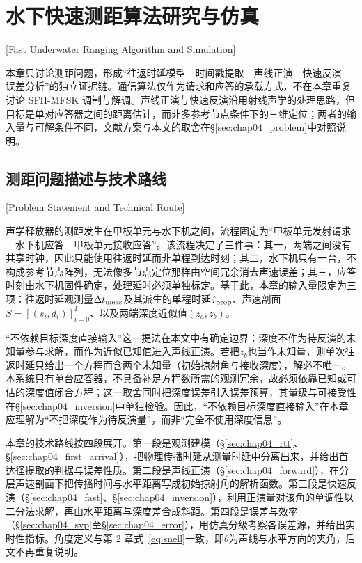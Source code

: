 
\chapter{水下快速测距算法研究与仿真}[Fast Underwater Ranging Algorithm and Simulation]
\label{chap04}

本章只讨论测距问题，形成“往返时延模型—时间戳提取—声线正演—快速反演—误差分析”的独立证据链。通信算法仅作为请求和应答的承载方式，不在本章重复讨论 SFH-MFSK 调制与解调。声线正演与快速反演沿用射线声学的处理思路，但目标是单对应答器之间的距离估计，而非多参考节点条件下的三维定位；两者的输入量与可解条件不同，文献方案与本文的取舍在\S\ref{sec:chap04_problem}中对照说明。

\section{测距问题描述与技术路线}[Problem Statement and Technical Route]
\label{sec:chap04_problem}

声学释放器的测距发生在甲板单元与水下机之间，流程固定为“甲板单元发射请求—水下机应答—甲板单元接收应答”。该流程决定了三件事：其一，两端之间没有共享时钟，因此只能使用往返时延而非单程到达时刻；其二，水下机只有一台，不构成参考节点阵列，无法像多节点定位那样由空间冗余消去声速误差；其三，应答时刻由水下机固件确定，处理延时必须单独标定。基于此，本章的输入量限定为三项：往返时延观测量$\Delta t_{\rm meas}$及其派生的单程时延$\hat{\tau}_{\rm prop}$、声速剖面$S=[(s_i,d_i)]_{i=0}^{I}$、以及两端深度近似值$(z_a,z_b)$。

“不依赖目标深度直接输入”这一提法在本文中有确定边界：深度不作为待反演的未知量参与求解，而作为近似已知值进入声线正演。若把$z_b$也当作未知量，则单次往返时延只给出一个方程而含两个未知量（初始掠射角与接收深度），解必不唯一。本系统只有单台应答器，不具备补足方程数所需的观测冗余，故必须依靠已知或可估的深度值闭合方程；这一取舍同时把深度误差引入误差预算，其量级与可接受性在\S\ref{sec:chap04_inversion}中单独检验。因此，“不依赖目标深度直接输入”在本章应理解为“不把深度作为待反演量”，而非“完全不使用深度信息”。

本章的技术路线按四段展开。第一段是观测建模（\S\ref{sec:chap04_rtt}、\S\ref{sec:chap04_first_arrival}），把物理传播时延从测量时延中分离出来，并给出首达径提取的判据与误差性质。第二段是声线正演（\S\ref{sec:chap04_forward}），在分层声速剖面下把传播时间与水平距离写成初始掠射角的解析函数。第三段是快速反演（\S\ref{sec:chap04_fast}、\S\ref{sec:chap04_inversion}），利用正演量对该角的单调性以二分法求解，再由水平距离与深度差合成斜距。第四段是误差与效率（\S\ref{sec:chap04_svp}至\S\ref{sec:chap04_error}），用仿真分级考察各误差源，并给出实时性指标。角度定义与第 2 章式~\eqref{eq:snell}一致，即$\theta$为声线与水平方向的夹角，后文不再重复说明。

